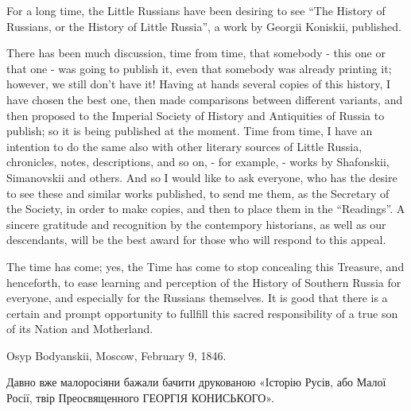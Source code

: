  
 
 
 
 

\begin{zznagolos}
\raggedcolumns
\begin{multicols}{2} %
\setlength{\parindent}{0pt}

For a long time, the Little Russians have been desiring to see \enquote{The
History of Russians, or the History of Little Russia}, a work by Georgii
Koniskii, published.

There has been much discussion, time from time, that somebody - this one or
that one - was going to publish it, even that somebody was already printing it;
however, we still don't have it! Having at hands several copies of this
history, I have chosen the best one, then made comparisons between different
variants, and then proposed to the Imperial Society of History and Antiquities
of Russia to publish; so it is being published at the moment. Time from time, I
have an intention to do the same also with other literary sources of Little
Russia, chronicles, notes, descriptions, and so on, - for example, - works by
Shafonskii, Simanovskii and others. And so I would like to ask everyone, who
has the desire to see these and similar works published, to send me them, as
the Secretary of the Society, in order to make copies, and then to place them
in the \enquote{Readings}. A sincere gratitude and recognition by the
contempory historians, as well as our descendants, will be the best award for
those who will respond to this appeal.

The time has come; yes, the Time has come to stop concealing this Treasure, and
henceforth, to ease learning and perception of the History of Southern Russia
for everyone, and especially for the Russians themselves.  It is good that
there is a certain and prompt opportunity to fullfill this sacred
responsibility of a true son of its Nation and Motherland.

Osyp Bodyanskii, Moscow, February 9, 1846. 

Давно вже малоросіяни бажали бачити друкованою «Історію Русів, або Малої Росії,
твір Преосвященного ГЕОРГІЯ КОНИСЬКОГО».


\end{multicols}
\end{zznagolos}
